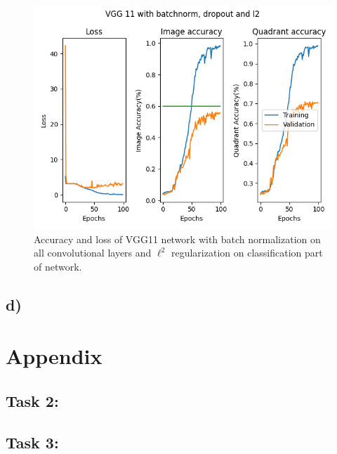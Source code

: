 \documentclass{article}
\begin{document}
\begin{figure}[h]
    \begin{center}
        \includegraphics{../Task3/Figures/VGG11withbatchnorm,dropoutandl2.png}
        \caption{Accuracy and loss of VGG11 network with batch normalization on all convolutional layers and $\ell^2$ regularization on classification part of network.}
        \label{fig::vgg11bnl2do}
    \end{center}
\end{figure}
\subsection*{d)}





\section{Appendix} 
\subsection{Task 2:}

\subsection{Task 3:}


\end{document}
